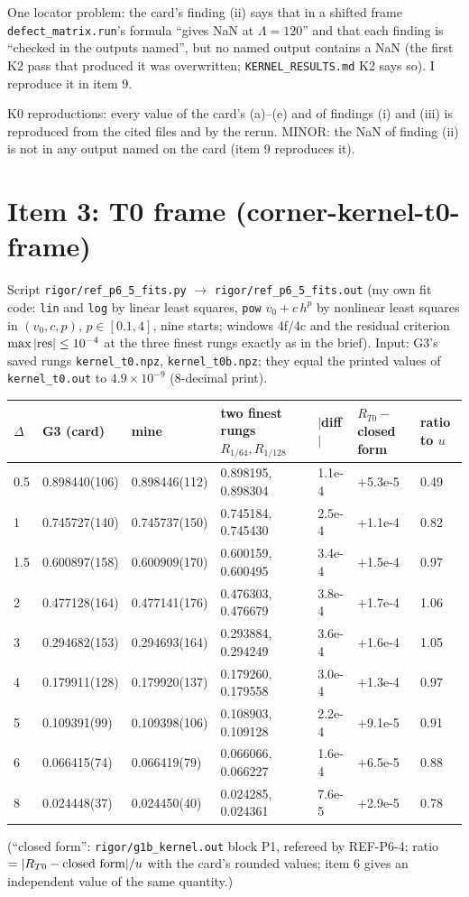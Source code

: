 \documentclass[11pt]{article}
\begin{document}
One locator problem: the card's finding (ii) says that in a shifted frame \texttt{defect\_matrix.run}'s formula ``gives NaN
at $\Lambda=120$'' and that each finding is ``checked in the outputs named'', but no named output contains a NaN (the
first K2 pass that produced it was overwritten; \texttt{KERNEL\_RESULTS.md} K2 says so). I reproduce it in item 9.
\begin{verdictok}
K0 reproductions: every value of the card's (a)--(e) and of findings (i) and (iii) is reproduced from the cited files and
by the rerun. MINOR: the NaN of finding (ii) is not in any output named on the card (item 9 reproduces it).
\end{verdictok}

\section{Item 3: T0 frame (corner-kernel-t0-frame)}
Script \texttt{rigor/ref\_p6\_5\_fits.py} $\to$ \texttt{rigor/ref\_p6\_5\_fits.out} (my own fit code: \texttt{lin}
and \texttt{log} by linear least squares, \texttt{pow} $v_0+c\,h^p$ by nonlinear least squares in $(v_0,c,p)$,
$p\in[0.1,4]$, nine starts; windows 4f/4c and the residual criterion $\max|{\rm res}|\le10^{-4}$ at the three finest
rungs exactly as in the brief). Input: G3's saved rungs \texttt{kernel\_t0.npz}, \texttt{kernel\_t0b.npz}; they equal the
printed values of \texttt{kernel\_t0.out} to $4.9\times10^{-9}$ (8-decimal print).

\begin{center}\small
\begin{tabular}{lllllll}\toprule
$\Delta$ & G3 (card) & mine & two finest rungs $R_{1/64},R_{1/128}$ & $|$diff$|$ & $R_{T0}-$closed form & ratio to $u$\\\midrule
0.5 & 0.898440(106) & 0.898446(112) & 0.898195, 0.898304 & 1.1e-4 & +5.3e-5 & 0.49\\
1   & 0.745727(140) & 0.745737(150) & 0.745184, 0.745430 & 2.5e-4 & +1.1e-4 & 0.82\\
1.5 & 0.600897(158) & 0.600909(170) & 0.600159, 0.600495 & 3.4e-4 & +1.5e-4 & 0.97\\
2   & 0.477128(164) & 0.477141(176) & 0.476303, 0.476679 & 3.8e-4 & +1.7e-4 & 1.06\\
3   & 0.294682(153) & 0.294693(164) & 0.293884, 0.294249 & 3.6e-4 & +1.6e-4 & 1.05\\
4   & 0.179911(128) & 0.179920(137) & 0.179260, 0.179558 & 3.0e-4 & +1.3e-4 & 0.97\\
5   & 0.109391(99)  & 0.109398(106) & 0.108903, 0.109128 & 2.2e-4 & +9.1e-5 & 0.91\\
6   & 0.066415(74)  & 0.066419(79)  & 0.066066, 0.066227 & 1.6e-4 & +6.5e-5 & 0.88\\
8   & 0.024448(37)  & 0.024450(40)  & 0.024285, 0.024361 & 7.6e-5 & +2.9e-5 & 0.78\\\bottomrule
\end{tabular}\end{center}
(``closed form'': \texttt{rigor/g1b\_kernel.out} block P1, refereed by REF-P6-4; ratio $=|R_{T0}-{\rm closed\ form}|/u$ with the
card's rounded values; item 6 gives an independent value of the same quantity.)
\end{document}
